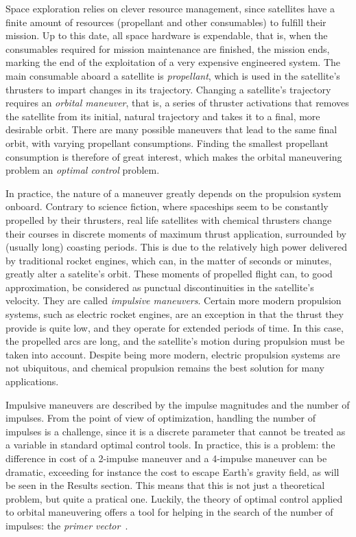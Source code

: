 






Space exploration relies on clever resource management, since satellites have a finite amount of resources (propellant and other consumables) to fulfill their mission. Up to this date, all space hardware is expendable, that is, when the consumables required for mission maintenance are finished, the mission ends, marking the end of the exploitation of a very expensive engineered system. The main consumable aboard a satellite is \textit{propellant}, which is used in the satellite's thrusters to impart changes in its trajectory. Changing a satellite's trajectory requires an \textit{orbital maneuver}, that is, a series of thruster activations that removes the satellite from its initial, natural trajectory and takes it to a final, more desirable orbit. There are many possible maneuvers that lead to the same final orbit, with varying propellant consumptions. Finding the smallest propellant consumption is therefore of great interest, which makes the orbital maneuvering problem an \textit{optimal control} problem.

In practice, the nature of a maneuver greatly depends on the propulsion system onboard. Contrary to science fiction, where spaceships seem to be constantly propelled by their thrusters, real life satellites with chemical thrusters change their courses in discrete moments of maximum thrust application, surrounded by (usually long) coasting periods. This is due to the relatively high power delivered by traditional rocket engines, which can, in the matter of seconds or minutes, greatly alter a satelite's orbit. These moments of propelled flight can, to good approximation, be considered as punctual discontinuities in the satellite's velocity. They are called \textit{impulsive maneuvers}. Certain more modern propulsion systems, such as electric rocket engines, are an exception in that the thrust they provide is quite low, and they operate for extended periods of time. In this case, the propelled arcs are long, and the satellite's motion during propulsion must be taken into account. Despite being more modern, electric propulsion systems are not ubiquitous, and chemical propulsion remains the best solution for many applications. 

Impulsive maneuvers are described by the impulse magnitudes and the number of impulses. From the point of view of optimization, handling the number of impulses is a challenge, since it is a discrete parameter that cannot be treated as a variable in standard optimal control tools. In practice, this is a problem: the difference in cost of a 2-impulse maneuver and a 4-impulse maneuver can be dramatic, exceeding for instance the cost to escape Earth's gravity field, as will be seen in the Results section. This means that this is not just a theoretical problem, but quite a pratical one. Luckily, the theory of optimal control applied to orbital maneuvering offers a tool for helping in the search of the number of impulses: the \textit{primer vector}~\cite{Conway_2010}.

